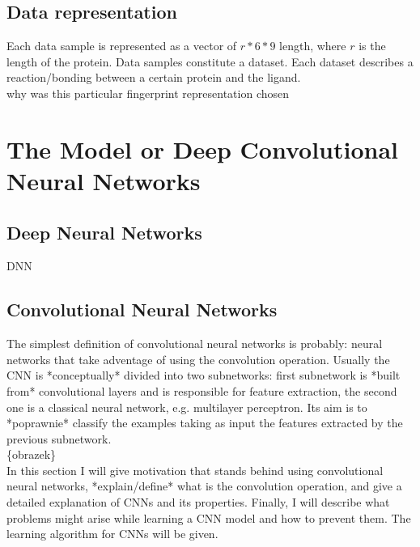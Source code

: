 \documentclass[a4paper,10pt]{report}
\begin{document}
    \section{Data representation} %
    Each data sample is represented as a vector of $r*6*9$ length, where $r$ is the length of the protein. Data samples constitute a dataset. Each dataset describes a reaction/bonding between a certain protein and the ligand.\\
    
    why was this particular fingerprint representation chosen %
    
    
  \chapter{The Model or Deep Convolutional Neural Networks}
    
    \section{Deep Neural Networks}
      DNN

    \section{Convolutional Neural Networks}
      The simplest definition of convolutional neural networks is probably: neural networks that take adventage of using the convolution operation. Usually the CNN is *conceptually* divided into two subnetworks: first subnetwork is *built from* convolutional layers and is responsible for feature extraction, the second one is a classical neural network, e.g. multilayer perceptron. Its aim is to *poprawnie* classify the examples taking as input the features extracted by the previous subnetwork.\\
      
      \{obrazek\} \\ %
      
      In this section I will give motivation that stands behind using convolutional neural networks, *explain/define* what is the convolution operation, and give a detailed explanation of CNNs and its properties. Finally, I will describe what problems might arise while learning a CNN model and how to prevent them. The learning algorithm for CNNs will be given.
      
\end{document}
